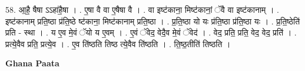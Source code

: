 \documentclass[17pt]{extarticle}
\begin{document}
58. आ॒है॒ षैषा ऽऽहा॑है॒षा । . ए॒षा वै वा ए॒षैषा वै । . वा इष्ट॑काना॒ मिष्ट॑कानां॒ ॅवै वा इष्ट॑कानाम् । . इष्ट॑कानाम् प्रति॒ष्ठा प्र॑ति॒ष्ठे ष्ट॑काना॒ मिष्ट॑कानाम् प्रति॒ष्ठा । . प्र॒ति॒ष्ठा यो यः प्र॑ति॒ष्ठा प्र॑ति॒ष्ठा यः । . प्र॒ति॒ष्ठेति॑ प्रति - स्था । . य ए॒व मे॒वं ॅयो य ए॒वम् । . ए॒वं ॅवेद॒ वेदै॒व मे॒वं ॅवेद॑ । . वेद॒ प्रति॒ प्रति॒ वेद॒ वेद॒ प्रति॑ । . प्रत्ये॒वैव प्रति॒ प्रत्ये॒व । . ए॒व ति॑ष्ठति तिष्ठ त्ये॒वैव ति॑ष्ठति । . ति॒ष्ठ॒तीति॑ तिष्ठति । \newline

\textbf{Ghana Paata } \newline
\end{document}
